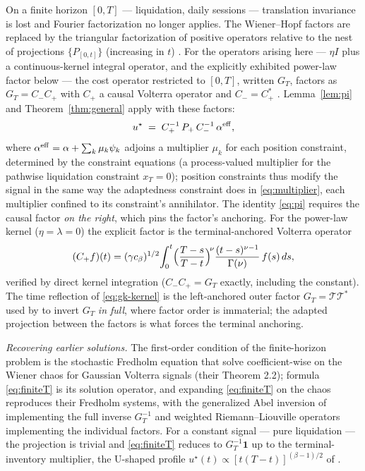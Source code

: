 \documentclass[11pt]{article}
\theoremstyle{plain}
\begin{document}
On a finite horizon $[0,T]$ --- liquidation, daily sessions --- translation invariance is lost and Fourier factorization no longer applies. The Wiener--Hopf factors are replaced by the triangular factorization of positive operators relative to the nest of projections $\{P_{[0,t]}\}$ (increasing in $t$) \citep{GohbergKrein1970,Arveson1975}. For the operators arising here --- $\eta I$ plus a continuous-kernel integral operator, and the explicitly exhibited power-law factor below --- the cost operator restricted to $[0,T]$, written $G_T$, factors as $G_T = C_-C_+$ with $C_+$ a causal Volterra operator and $C_- = C_+^*$ \citep{GohbergKrein1970,Arveson1975}. Lemma~\ref{lem:pi} and Theorem~\ref{thm:general} apply with these factors:
\begin{equation}\label{eq:finiteT}
u^\star \;=\; C_+^{-1}\,P_+\,C_-^{-1}\,\alpha^{\rm eff},
\end{equation}
where $\alpha^{\rm eff} = \alpha + \sum_k \mu_k\psi_k$ adjoins a multiplier $\mu_k$ for each position constraint, determined by the constraint equations (a process-valued multiplier for the pathwise liquidation constraint $x_T = 0$); position constraints thus modify the signal in the same way the adaptedness constraint does in \eqref{eq:multiplier}, each multiplier confined to its constraint's annihilator. The identity \eqref{eq:pi} requires the causal factor \emph{on the right}, which pins the factor's anchoring. For the power-law kernel ($\eta=\lambda=0$) the explicit factor is the terminal-anchored Volterra operator
\begin{equation}\label{eq:gk-kernel}
(C_+f)(t) = (\gamma c_\beta)^{1/2}\!\int_0^t \Bigl(\frac{T-s}{T-t}\Bigr)^{\!\nu}\frac{(t-s)^{\nu-1}}{\Gamma(\nu)}\,f(s)\,ds,
\end{equation}
verified by direct kernel integration ($C_-C_+ = G_T$ exactly, including the constant). The time reflection of \eqref{eq:gk-kernel} is the left-anchored outer factor $G_T = \mathcal T\mathcal T^*$ used by \citet[pp.~590--591]{FordeSanchezSmith2022} to invert $G_T$ \emph{in full}, where factor order is immaterial; the adapted projection between the factors is what forces the terminal anchoring.

\emph{Recovering earlier solutions.} The first-order condition of the finite-horizon problem is the stochastic Fredholm equation that \citet{FordeSanchezSmith2022} solve coefficient-wise on the Wiener chaos for Gaussian Volterra signals (their Theorem 2.2); formula \eqref{eq:finiteT} is its solution operator, and expanding \eqref{eq:finiteT} on the chaos reproduces their Fredholm systems, with the generalized Abel inversion of \citet{ChakrabartiGeorge1994} implementing the full inverse $G_T^{-1}$ and weighted Riemann--Liouville operators implementing the individual factors. For a constant signal --- pure liquidation --- the projection is trivial and \eqref{eq:finiteT} reduces to $G_T^{-1}\mathbf 1$ up to the terminal-inventory multiplier, the U-shaped profile $u^\star(t) \propto [t(T-t)]^{(\beta-1)/2}$ of \citet[Ex.~2.30]{GatheralSchiedSlynko2012}.
\end{document}
